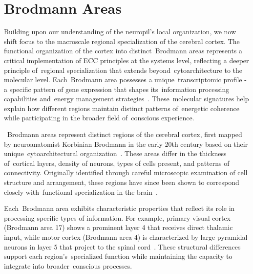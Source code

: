 \section{Brodmann Areas~}

Building upon our understanding of the neuropil's local organization, we now shift focus to the macroscale regional specialization of the cerebral cortex. The functional organization of the cortex into distinct~Brodmann areas represents a critical implementation of ECC principles at the systems level, reflecting a deeper principle of~regional specialization that extends beyond~cytoarchitecture to the molecular level. Each~Brodmann area possesses a unique~transcriptomic profile - a specific pattern of gene expression that shapes its~information processing capabilities and~energy management strategies~\cite{Amunts2015, Hawrylycz2012}. These~molecular signatures help explain how different regions maintain distinct patterns of~energetic coherence while participating in the broader field of~conscious experience.

~Brodmann areas represent distinct regions of the cerebral cortex, first mapped by neuroanatomist Korbinian Brodmann in the early 20th century based on their unique~cytoarchitectural organization~\cite{Brodmann1909, Zilles2010}. These areas differ in the thickness of~cortical layers, density of neurons, types of cells present, and patterns of connectivity. Originally identified through careful microscopic examination of cell structure and arrangement, these regions have since been shown to correspond closely with~functional specialization in the brain~\cite{Eickhoff2018, Glasser2016}.

Each~Brodmann area exhibits characteristic properties that reflect its role in processing specific types of information. For example, primary visual cortex (Brodmann area 17) shows a prominent layer 4 that receives direct thalamic input, while motor cortex (Brodmann area 4) is characterized by large pyramidal neurons in layer 5 that project to the spinal cord~\cite{Zilles2010, Palomero-Gallagher2019}. These structural differences support each region's~specialized function while maintaining the capacity to integrate into broader~conscious processes.

